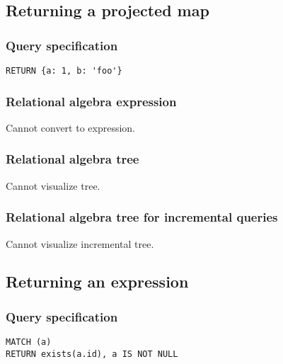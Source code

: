 
\subsection{Returning a projected map}

\subsubsection*{Query specification}

\begin{lstlisting}
RETURN {a: 1, b: 'foo'}
\end{lstlisting}

\subsubsection*{Relational algebra expression}

Cannot convert to expression.

\subsubsection*{Relational algebra tree}

Cannot visualize tree.

\subsubsection*{Relational algebra tree for incremental queries}

Cannot visualize incremental tree.

\subsection{Returning an expression}

\subsubsection*{Query specification}

\begin{lstlisting}
MATCH (a)
RETURN exists(a.id), a IS NOT NULL
\end{lstlisting}

